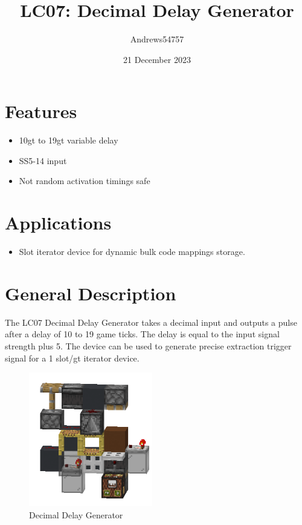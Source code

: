 \documentclass[10pt]{datasheet}
\title{LC07: Decimal Delay Generator}
\author{Andrews54757}
\date{21 December 2023}
\begin{document}
\maketitle

\section{Features}

\begin{itemize}
\item{10gt to 19gt variable delay}
\item{SS5-14 input}
\item{Not random activation timings safe}
\end{itemize}

\section{Applications}

\begin{itemize}
\item{Slot iterator device for dynamic bulk code mappings storage.}
\end{itemize}

\section{General Description}

The LC07 Decimal Delay Generator takes a decimal input and outputs a pulse after a delay of 10 to 19 game ticks. The delay is equal to the input signal strength plus 5. The device can be used to generate precise extraction trigger signal for a 1 slot/gt iterator device.

\vfill\break

\begin{figure}[h]
    \centering
    \includegraphics[width=0.48\textwidth]{decimaldelay.png}
    \caption{\centering Decimal Delay Generator}
\end{figure}
\end{document}
